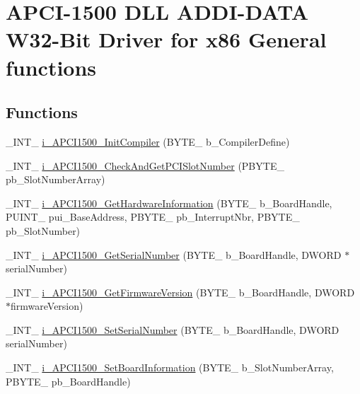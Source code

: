 \hypertarget{group___general_functions}{}\section{A\+P\+C\+I-\/1500 D\+LL A\+D\+D\+I-\/\+D\+A\+TA W32-\/\+Bit Driver for x86 General functions}
\label{group___general_functions}
\subsection*{Functions}
\begin{DoxyCompactItemize}
\item 
\+\_\+\+I\+N\+T\+\_\+ \mbox{\hyperlink{group___general_functions_ga283828f6037ecf34146ddeba2ffa2012}{i\+\_\+\+A\+P\+C\+I1500\+\_\+\+Init\+Compiler}} (B\+Y\+T\+E\+\_\+ b\+\_\+\+Compiler\+Define)
\item 
\+\_\+\+I\+N\+T\+\_\+ \mbox{\hyperlink{group___general_functions_gade589c63a37eb3e97b01c64ef431f35a}{i\+\_\+\+A\+P\+C\+I1500\+\_\+\+Check\+And\+Get\+P\+C\+I\+Slot\+Number}} (P\+B\+Y\+T\+E\+\_\+ pb\+\_\+\+Slot\+Number\+Array)
\item 
\+\_\+\+I\+N\+T\+\_\+ \mbox{\hyperlink{group___general_functions_ga3b4e9c4d128e73120d4cd078d47eee7a}{i\+\_\+\+A\+P\+C\+I1500\+\_\+\+Get\+Hardware\+Information}} (B\+Y\+T\+E\+\_\+ b\+\_\+\+Board\+Handle, P\+U\+I\+N\+T\+\_\+ pui\+\_\+\+Base\+Address, P\+B\+Y\+T\+E\+\_\+ pb\+\_\+\+Interrupt\+Nbr, P\+B\+Y\+T\+E\+\_\+ pb\+\_\+\+Slot\+Number)
\item 
\+\_\+\+I\+N\+T\+\_\+ \mbox{\hyperlink{group___general_functions_ga7701648de75a39ddfb0c61085f80f84e}{i\+\_\+\+A\+P\+C\+I1500\+\_\+\+Get\+Serial\+Number}} (B\+Y\+T\+E\+\_\+ b\+\_\+\+Board\+Handle, D\+W\+O\+RD $\ast$serial\+Number)
\item 
\+\_\+\+I\+N\+T\+\_\+ \mbox{\hyperlink{group___general_functions_ga507b96425ffacbdab7f22b48c5119209}{i\+\_\+\+A\+P\+C\+I1500\+\_\+\+Get\+Firmware\+Version}} (B\+Y\+T\+E\+\_\+ b\+\_\+\+Board\+Handle, D\+W\+O\+RD $\ast$firmware\+Version)
\item 
\+\_\+\+I\+N\+T\+\_\+ \mbox{\hyperlink{group___general_functions_gadfaaf79638df473d3ef0bcd02ece2850}{i\+\_\+\+A\+P\+C\+I1500\+\_\+\+Set\+Serial\+Number}} (B\+Y\+T\+E\+\_\+ b\+\_\+\+Board\+Handle, D\+W\+O\+RD serial\+Number)
\item 
\+\_\+\+I\+N\+T\+\_\+ \mbox{\hyperlink{group___general_functions_ga96e68e03955a0fde4bfc02b3a6d64dce}{i\+\_\+\+A\+P\+C\+I1500\+\_\+\+Set\+Board\+Information}} (B\+Y\+T\+E\+\_\+ b\+\_\+\+Slot\+Number\+Array, P\+B\+Y\+T\+E\+\_\+ pb\+\_\+\+Board\+Handle)

\end{DoxyCompactItemize}
